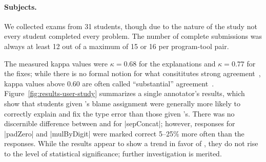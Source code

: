 \paragraph{Subjects.}
%
We collected exams from 31 students, though due to the nature of the
study not every student completed every problem.
%
The number of complete submissions was always at least 12 out of
a maximum of 15 or 16 per program-tool pair.
%




%
The measured kappa values were $\kappa = 0.68$ for the explanations and
$\kappa = 0.77$ for the fixes; while there is no formal notion for what
consititutes strong agreement~\cite{Krippendorff2012-wd}, kappa values
above $0.60$ are often called ``substantial''
agreement~\cite{Landis1977-ey}.
%
Figure~\ref{fig:results-user-study} summarizes a single annotator's
results, which show that students given \toolname's blame assignment
were generally more likely to correctly explain and fix the type error
than those given \sherrloc's.
%
There was no discernible difference between \toolname and
\sherrloc for |sepConcat|; however, \toolname responses for |padZero| and
|mulByDigit| were marked correct 5--25\% more often than the \sherrloc
responses.
%
While the results appear to show a trend in favor of \toolname,
they do not rise to the level of statistical significance;
further investigation is merited.
%
